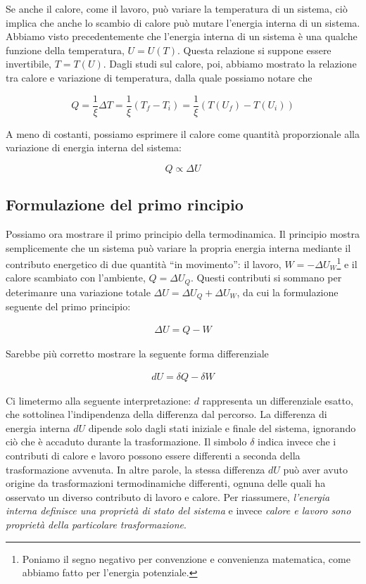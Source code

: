 Se anche il calore, come il lavoro, può variare la temperatura di un sistema,
ciò implica che anche lo scambio di calore può mutare l'energia interna di
un sistema.
Abbiamo visto precedentemente che l'energia interna di un sistema è una qualche
funzione della temperatura, $U = U(T)$. Questa relazione si suppone essere
invertibile, $T = T(U)$. Dagli studi sul calore, poi, abbiamo mostrato la
relazione tra calore e variazione di temperatura, dalla quale possiamo notare
che

\[ Q = \frac{1}{\xi}\Delta T = \frac{1}{\xi}(T_f - T_i) = \frac{1}{\xi}(T(U_f) - T(U_i)) \]

\noindent A meno di costanti, possiamo esprimere il calore come quantità
proporzionale alla variazione di energia interna del sistema:

\[ Q \propto \Delta U \]

\subsection{Formulazione del primo rincipio}
Possiamo ora mostrare il primo principio della termodinamica. Il principio
mostra semplicemente che un sistema può variare la propria energia interna
mediante il contributo energetico di due quantità ``in movimento'': il lavoro,
$W = -\Delta U_W$\footnote{Poniamo il segno negativo per convenzione e convenienza matematica, come abbiamo fatto per l'energia potenziale.}
e il calore scambiato con l'ambiente, $Q = \Delta U_Q$. Questi contributi si sommano per deterimanre una
variazione totale $\Delta U = \Delta U_Q  + \Delta U_W$, da cui la formulazione
seguente del primo principio:

\begin{align}
    \Delta U = Q - W\label{firstprincip}
\end{align}

\noindent Sarebbe più corretto mostrare la seguente forma differenziale

\begin{tcolorbox}[colback = red!30, colframe = red!30!black, title = {Primo principio della termodinamica}]
\begin{align}
    dU = \delta Q - \delta W
\end{align}
\end{tcolorbox}

\noindent Ci limetermo alla seguente interpretazione: $d$ rappresenta
un differenziale esatto, che sottolinea l'indipendenza della differenza
dal percorso. La differenza di energia interna $dU$ dipende solo dagli
stati iniziale e finale del sistema, ignorando ciò che è accaduto durante la
trasformazione.
Il simbolo $\delta$ indica invece che i contributi di calore e lavoro
possono essere differenti a seconda della trasformazione
avvenuta. In altre parole, la stessa differenza $dU$ può aver
avuto origine da trasformazioni termodinamiche differenti, ognuna
delle quali ha osservato un diverso contributo di lavoro e calore.
Per riassumere, \textit{l'energia interna definisce una proprietà
di stato del sistema} e invece \textit{calore e lavoro sono proprietà
della particolare trasformazione}.

